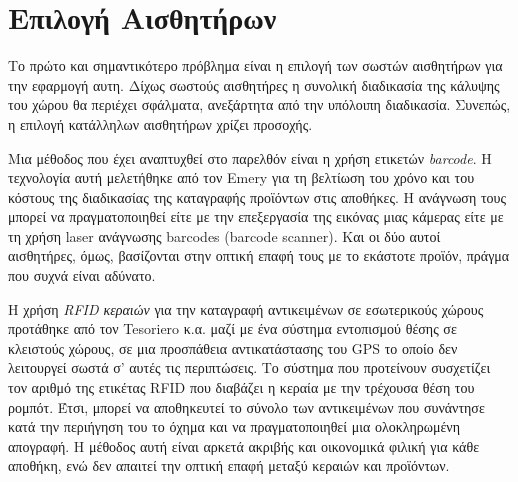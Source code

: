 \section{Επιλογή Αισθητήρων}
\label{section:sensor_selection}


Το πρώτο και σημαντικότερο πρόβλημα είναι η επιλογή των σωστών αισθητήρων για την εφαρμογή αυτη. Δίχως σωστούς αισθητήρες η συνολική διαδικασία της κάλυψης του χώρου θα περιέχει σφάλματα, ανεξάρτητα από την υπόλοιπη διαδικασία. Συνεπώς, η επιλογή κατάλληλων αισθητήρων χρίζει προσοχής.

Μια μέθοδος που έχει αναπτυχθεί στο παρελθόν είναι η χρήση ετικετών \emph{barcode}. Η τεχνολογία αυτή μελετήθηκε από τον Emery \cite{barcodes} για τη βελτίωση του χρόνο και του κόστους της διαδικασίας της καταγραφής προϊόντων στις αποθήκες. Η ανάγνωση τους μπορεί να πραγματοποιηθεί είτε με την επεξεργασία της εικόνας μιας κάμερας είτε με τη χρήση laser ανάγνωσης barcodes (barcode scanner). Και οι δύο αυτοί αισθητήρες, όμως, βασίζονται στην οπτική επαφή τους με το εκάστοτε προϊόν, πράγμα που συχνά είναι αδύνατο.

Η χρήση \emph{RFID κεραιών} για την καταγραφή αντικειμένων σε εσωτερικούς χώρους προτάθηκε από τον Tesoriero κ.α. \cite{tesoriero2009} μαζί με ένα σύστημα εντοπισμού θέσης σε κλειστούς χώρους, σε μια προσπάθεια αντικατάστασης του GPS το οποίο δεν λειτουργεί σωστά σ' αυτές τις περιπτώσεις. Το σύστημα που προτείνουν συσχετίζει τον αριθμό της ετικέτας RFID που διαβάζει η κεραία με την τρέχουσα θέση του ρομπότ. Έτσι, μπορεί να αποθηκευτεί το σύνολο των αντικειμένων που συνάντησε κατά την περιήγηση του το όχημα και να πραγματοποιηθεί μια ολοκληρωμένη απογραφή. Η μέθοδος αυτή είναι αρκετά ακριβής και οικονομικά φιλική για κάθε αποθήκη, ενώ δεν απαιτεί την οπτική επαφή μεταξύ κεραιών και προϊόντων.
